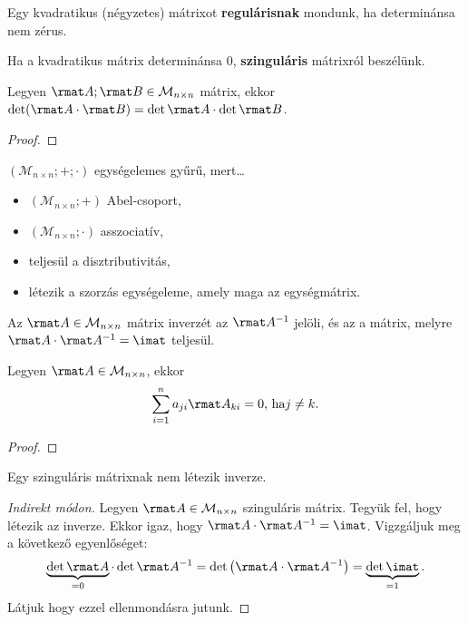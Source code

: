 \begin{definition}
  Egy kvadratikus (négyzetes) mátrixot \textbf{regulárisnak} mondunk, ha
  determinánsa nem zérus.

  Ha a kvadratikus mátrix determinánsa 0, \textbf{szinguláris} mátrixról
  beszélünk.
\end{definition}

\begin{theorem}
  Legyen $\rmat A; \rmat B \in \mathcal M_{n \times n}$ mátrix, ekkor
  $\det(\rmat A \cdot \rmat B) = \det \rmat A \cdot \det \rmat B$.

  \begin{proof}
    \vspace{8em}
  \end{proof}
\end{theorem}

\begin{statement}
  $(\mathcal M_{n \times n}; +; \cdot)$ egységelemes gyűrű, mert\dots
  \begin{itemize}
    \item  $(\mathcal M_{n \times n}; +)$ Abel-csoport,
    \item $(\mathcal M_{n \times n}; \cdot)$ asszociatív,
    \item teljesül a disztributivitás,
    \item létezik a szorzás egységeleme, amely maga az egységmátrix.
  \end{itemize}
\end{statement}

\begin{definition}
  Az $\rmat A \in \mathcal M_{n \times n}$ mátrix inverzét az $\rmat A^{-1}$
  jelöli, és az a mátrix, melyre $\rmat A \cdot \rmat A^{-1} = \imat$
  teljesül.
\end{definition}

\begin{theorem}
  Legyen $\rmat A \in \mathcal M_{n \times n}$, ekkor
  $$
    \sum_{i=1}^{n} a_{ji} \rmat A_{ki} = 0
    \text{, ha}
    j \neq k
    \text.
  $$

  \begin{proof}
    \vspace{6em}
  \end{proof}
\end{theorem}

\begin{statement}
  Egy szinguláris mátrixnak nem létezik inverze.

  \begin{proof}[Indirekt módon]
    Legyen $\rmat A \in \mathcal M_{n \times n}$ szinguláris mátrix. Tegyük fel,
    hogy létezik az inverze. Ekkor igaz, hogy
    $\rmat A \cdot \rmat A^{-1} = \imat$.
    Vigzgáljuk meg a következő egyenlőséget:
    $$
      \underbrace{\det \rmat A}_{=0} \cdot \det \rmat A^{-1}
      = \det \left( \rmat A \cdot \rmat A^{-1} \right)
      = \underbrace{\det \imat}_{=1}
      \text.
    $$
    Látjuk hogy ezzel ellenmondásra jutunk.
  \end{proof}
\end{statement}

